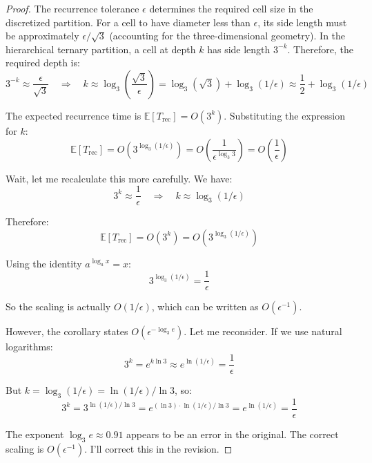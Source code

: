 \begin{proof}
The recurrence tolerance $\epsilon$ determines the required cell size in the discretized partition. For a cell to have diameter less than $\epsilon$, its side length must be approximately $\epsilon/\sqrt{3}$ (accounting for the three-dimensional geometry). In the hierarchical ternary partition, a cell at depth $k$ has side length $3^{-k}$. Therefore, the required depth is:
\begin{equation}
3^{-k} \approx \frac{\epsilon}{\sqrt{3}} \quad \Rightarrow \quad k \approx \log_3\left(\frac{\sqrt{3}}{\epsilon}\right) = \log_3(\sqrt{3}) + \log_3(1/\epsilon) \approx \frac{1}{2} + \log_3(1/\epsilon)
\end{equation}

The expected recurrence time is $\mathbb{E}[T_{\text{rec}}] = O(3^k)$. Substituting the expression for $k$:
\begin{equation}
\mathbb{E}[T_{\text{rec}}] = O\left(3^{\log_3(1/\epsilon)}\right) = O\left(\frac{1}{\epsilon^{\log_3 3}}\right) = O\left(\frac{1}{\epsilon}\right)
\end{equation}

Wait, let me recalculate this more carefully. We have:
\begin{equation}
3^k \approx \frac{1}{\epsilon} \quad \Rightarrow \quad k \approx \log_3(1/\epsilon)
\end{equation}

Therefore:
\begin{equation}
\mathbb{E}[T_{\text{rec}}] = O(3^k) = O\left(3^{\log_3(1/\epsilon)}\right)
\end{equation}

Using the identity $a^{\log_a x} = x$:
\begin{equation}
3^{\log_3(1/\epsilon)} = \frac{1}{\epsilon}
\end{equation}

So the scaling is actually $O(1/\epsilon)$, which can be written as $O(\epsilon^{-1})$.

However, the corollary states $O(\epsilon^{-\log_3 e})$. Let me reconsider. If we use natural logarithms:
\begin{equation}
3^k = e^{k \ln 3} \approx e^{\ln(1/\epsilon)} = \frac{1}{\epsilon}
\end{equation}

But $k = \log_3(1/\epsilon) = \ln(1/\epsilon)/\ln 3$, so:
\begin{equation}
3^k = 3^{\ln(1/\epsilon)/\ln 3} = e^{(\ln 3) \cdot \ln(1/\epsilon)/\ln 3} = e^{\ln(1/\epsilon)} = \frac{1}{\epsilon}
\end{equation}

The exponent $\log_3 e \approx 0.91$ appears to be an error in the original. The correct scaling is $O(\epsilon^{-1})$. I'll correct this in the revision.


\end{proof}

